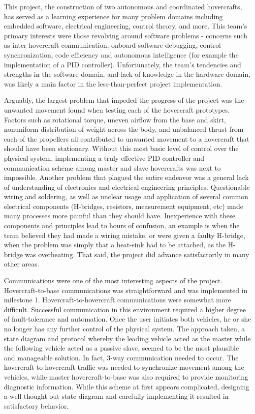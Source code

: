 This project, the construction of two autonomous and coordinated hovercrafts, has served as a learning experience for many problem domains including embedded software, electrical engineering, control theory, and more.  This team's primary interests were those revolving around software problems - concerns such as inter-hovercraft communication, onboard software debugging, control synchronization, code efficiency and autonomous intelligence (for example the implementation of a PID controller).  Unfortunately, the team's tendencies and strengths in the software domain, and lack of knowledge in the hardware domain, was likely a main factor in the less-than-perfect project implementation.  

Arguably, the largest problem that impeded the progress of the project was the unwanted movement found when testing each of the hovercraft prototypes.  Factors such as rotational torque, uneven airflow from the base and skirt, nonuniform distribution of weight across the body, and unbalanced thrust from each of the propellers all contributed to unwanted movement to a hovercraft that should have been stationary.  Without this most basic level of control over the physical system, implementing a truly effective PID controller and communication scheme among master and slave hovercrafts was next to impossible.  Another problem that plagued the entire endeavor was a general lack of understanding of electronics and electrical engineering principles.  Questionable wiring and soldering, as well as unclear usage and application of several common electrical components (H-bridges, resistors, measurement equipment, etc) made many processes more painful than they should have.  Inexperience with these components and principles lead to hours of confusion, an example is when the team believed they had made a wiring mistake, or were given a faulty H-bridge, when the problem was simply that a heat-sink had to be attached, as the H-bridge was overheating. That said, the project did advance satisfactorily in many other areas.  

Communications were one of the most interesting aspects of the project.  Hovercraft-to-base communications was straightforward and was implemented in milestone 1.  Hovercraft-to-hovercraft communications were somewhat more difficult.  Successful communication in this environment required a higher degree of fault-tolerance and automation. Once the user initiates both vehicles, he or she no longer has any further control of the physical system.  The approach taken, a state diagram and protocol whereby the leading vehicle acted as the master while the following vehicle acted as a passive slave, seemed to be the most plausible and manageable solution.  In fact, 3-way communication needed to occur.  The hovercraft-to-hovercraft traffic was needed to synchronize movement among the vehicles, while master hovercraft-to-base was also required to provide monitoring diagnostic information.  While this scheme at first appears complicated, designing a well thought out state diagram and carefully implementing it resulted in satisfactory behavior.  

